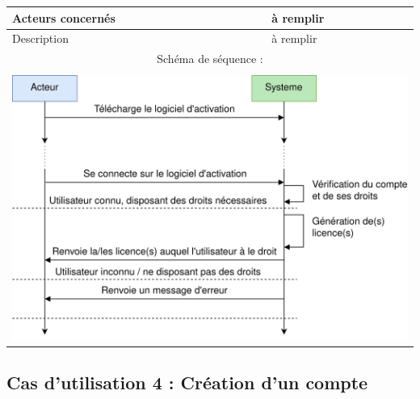 \begin{table}[!h]
        \centering
        \begin{tabular}{| m{5cm} | m{10cm} |}
                \hline
                    Acteurs concernés & à remplir \\
                \hline
                    Description & à remplir \\
                \hline
                    \multicolumn{2}{|c|}{Schéma de séquence :} \\
                \hline
                    \multicolumn{2}{|c|}{}\\
                    \multicolumn{2}{|c|}{\includegraphics[width=15cm]{main/png/seq_activation.png}} \\
                \hline
        \end{tabular}
        \label{tab:tab3}
\end{table}
\newpage

\subsection{Cas d'utilisation 4 : Création d'un compte}

